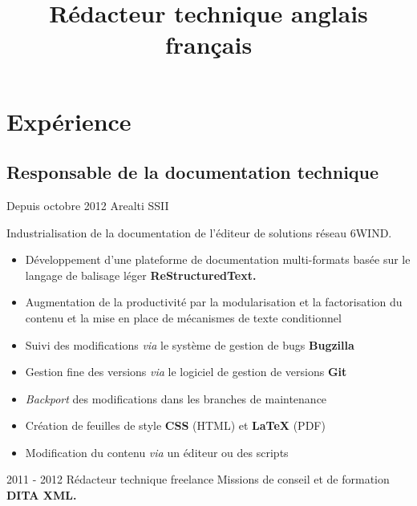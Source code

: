 \documentclass[12pt,a4paper,roman]{moderncv}
\title
    {Rédacteur technique anglais français}
\begin{document}
\makecvtitle %


\section{Expérience}

\subsection{Responsable de la documentation technique}

\cventry
    {Depuis octobre 2012}
    {Arealti}
    {SSII}
    {}
    {}
    {Industrialisation de la documentation de l'éditeur de solutions réseau
      6WIND.
      \begin{itemize}
      \item Développement d'une plateforme de documentation multi-formats
        basée sur le langage de balisage léger \textbf{ReStructuredText.}
      \item Augmentation de la productivité par la modularisation et la
        factorisation du contenu et la mise en place de mécanismes de texte
        conditionnel
      \item Suivi des modifications \textit{via} le système de gestion de
        bugs \textbf{Bugzilla}
      \item Gestion fine des versions \textit{via} le logiciel de gestion de
        versions \textbf{Git}
      \item \textit{Backport} des modifications dans les branches de
        maintenance
      \item Création de feuilles de style \textbf{CSS} (HTML) et
        \textbf{\LaTeX} (PDF)
      \item Modification du contenu \textit{via} un éditeur ou des scripts
      \end{itemize}
    }


\cventry
    {2011 - 2012}
    {Rédacteur technique freelance}
    {\textsc{}}
    {}
    {}
    {Missions de conseil et de formation \textbf{DITA XML.}}

\end{document}
